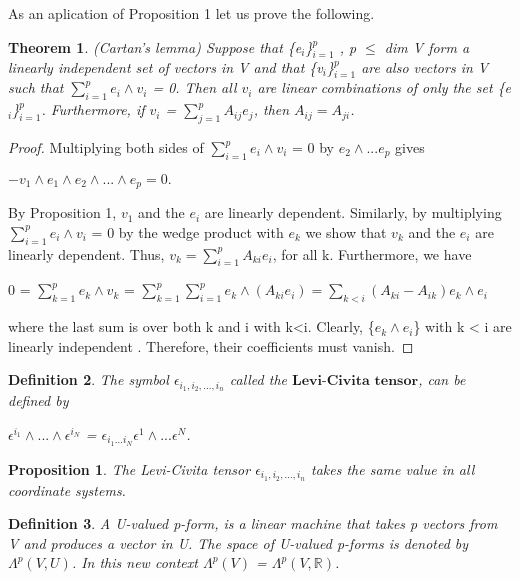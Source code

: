 \documentclass[12pt,a4paper]{article}
\newtheorem{thm}{Theorem}
\newtheorem{defn}[thm]{Definition}
\newtheorem{prop}{Proposition}
\begin{document}
As an aplication of Proposition 1 let us prove the following.
\begin{thm}
(Cartan’s lemma) Suppose that \{e$_i$\}$^p_{i=1}$ , p $\leq$ dim V form
a linearly independent set of vectors in V and that  \{v$_i$\}$^p_{i=1}$ are also vectors
in V such that $\sum^{p}_{i=1} e_i \wedge v_i$ = 0. Then all $v_i$ are linear combinations of only
the set \{e$_i$\}$^p_{i=1}$. Furthermore, if $v_i$ = $\sum^p_{j=1} A_{ij}e_{j}$, then $A_{ij} = A_{ji}$.
\end{thm}
\begin{proof}
Multiplying both sides of $\sum^{p}_{i=1} e_i \wedge v_i$ = 0 by $e_2 \wedge ... e_p$ gives
\begin{center}
$-v_1 \wedge e_1 \wedge e_2 \wedge ... \wedge e_p = 0.$
\end{center}
By Proposition 1, $v_1$ and the $e_i$ are linearly dependent. Similarly, by
multiplying $\sum^{p}_{i=1} e_i \wedge v_i$ = 0 by the wedge product with $e_k$  we
show that $v_k$ and  the $e_i$ are linearly dependent. Thus, $v_k = \sum^p_{i=1} A_{ki} e_i$, for all k. Furthermore, we have\\
\begin{center}
 0 = $\sum^{p}_{k=1} e_k \wedge v_k$  = $\sum^{p}_{k=1} \sum^{p}_{i=1} e_k \wedge ( A_{ki} e_i) = \sum_{k<i} (A_{ki} - A_{ik}) e_k \wedge e_i$
\end{center}
where the last sum is over both k and i with k<i. Clearly, \{$e_k \wedge e_i$\} with k <
i are linearly independent . Therefore, their coefficients must
vanish.
\end{proof}
\begin{defn}
The symbol $\epsilon_{i_1, i_2, ... , i_n}$ called the $\textbf{Levi-Civita tensor}$, can be defined by
\begin{center}
$\epsilon^{i_1} \wedge ... \wedge \epsilon^{i_N} $ = $\epsilon_{i_1 ... i_N} \epsilon^1 \wedge ... \epsilon^N$.
\end{center}
\end{defn}
\begin{prop}
The Levi-Civita tensor $\epsilon_{i_1, i_2, ... , i_n}$ takes the same value in
all coordinate systems.
\end{prop}
\begin{defn}
A U-valued p-form, is a linear machine that takes p
vectors from V and produces a vector in U. The space of U-valued p-forms
is denoted by $\Lambda^{p}(V, U)$.  In this new context $\Lambda^{p}(V)$ =  $\Lambda^{p}(V, \mathbb{R})$.
\end{defn}
\end{document}

